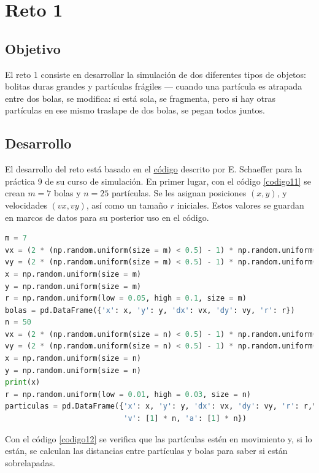 \documentclass{report}
\begin{document}
\chapter{Reto 1}

\section{Objetivo}
El reto 1 consiste en desarrollar la simulaci\'on de dos diferentes tipos de objetos: bolitas duras grandes y partículas frágiles — cuando una partícula es atrapada entre dos bolas, se modifica: si está sola, se fragmenta, pero si hay otras partículas en ese mismo traslape de dos bolas, se pegan todos juntos.

\section{Desarrollo}
El desarrollo del reto est\'a basado en el \href{https://satuelisa.github.io/simulation/p9.html}{c\'odigo} descrito por E. Schaeffer para la pr\'actica 9 de su curso de simulaci\'on. En primer lugar, con el c\'odigo \ref{codigo11} se crean $m=7$ bolas y $n=25$ part\'iculas. Se les asignan posiciones $(x, y)$, y velocidades $(vx, vy)$, as\'i como un tama\~no $r$ iniciales. Estos valores se guardan en marcos de datos para su posterior uso en el c\'odigo.

\begin{lstlisting}[caption=Creaci\'on de Bolas y Part\'iculas, label=codigo11, language=Python]
m = 7
vx = (2 * (np.random.uniform(size = m) < 0.5) - 1) * np.random.uniform(low = 0.01, high = 0.04, size = m)
vy = (2 * (np.random.uniform(size = m) < 0.5) - 1) * np.random.uniform(low = 0.01, high = 0.04, size = m)
x = np.random.uniform(size = m)
y = np.random.uniform(size = m)
r = np.random.uniform(low = 0.05, high = 0.1, size = m)
bolas = pd.DataFrame({'x': x, 'y': y, 'dx': vx, 'dy': vy, 'r': r})
n = 50
vx = (2 * (np.random.uniform(size = n) < 0.5) - 1) * np.random.uniform(low = 0.02, high = 0.05, size = n)
vy = (2 * (np.random.uniform(size = n) < 0.5) - 1) * np.random.uniform(low = 0.02, high = 0.05, size = n)
x = np.random.uniform(size = n)
y = np.random.uniform(size = n)
print(x)
r = np.random.uniform(low = 0.01, high = 0.03, size = n)
particulas = pd.DataFrame({'x': x, 'y': y, 'dx': vx, 'dy': vy, 'r': r,\
                           'v': [1] * n, 'a': [1] * n})
\end{lstlisting}

Con el c\'odigo \ref{codigo12} se verifica que las part\'iculas est\'en en movimiento y, si lo est\'an, se calculan las distancias entre part\'iculas y bolas para saber si est\'an sobrelapadas.
\end{document}
